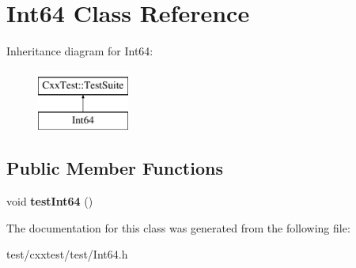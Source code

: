\hypertarget{classInt64}{\section{Int64 Class Reference}
\label{classInt64}
}
Inheritance diagram for Int64\-:\begin{figure}[H]
\begin{center}
\leavevmode
\includegraphics[height=2.000000cm]{classInt64}
\end{center}
\end{figure}
\subsection*{Public Member Functions}
\begin{DoxyCompactItemize}
\item 
\hypertarget{classInt64_aa3950008e09ea04f5ea3cdbba944e834}{void {\bfseries test\-Int64} ()}\label{classInt64_aa3950008e09ea04f5ea3cdbba944e834}

\end{DoxyCompactItemize}


The documentation for this class was generated from the following file\-:\begin{DoxyCompactItemize}
\item 
test/cxxtest/test/Int64.\-h\end{DoxyCompactItemize}
